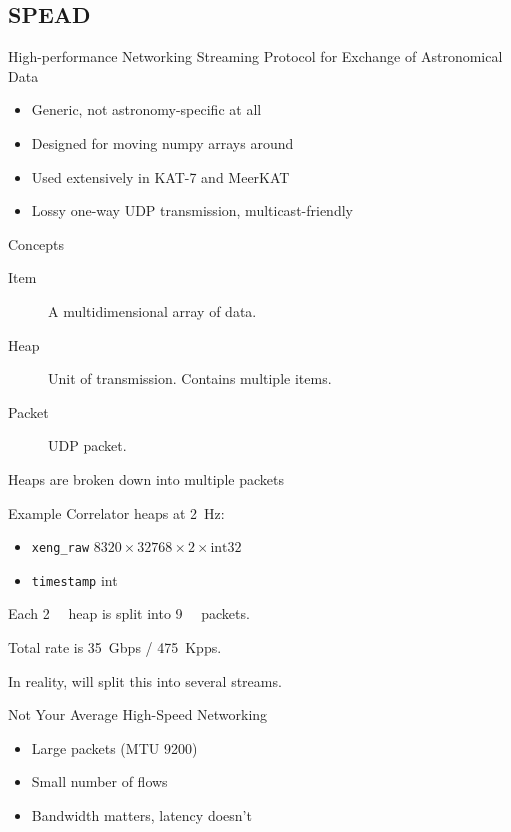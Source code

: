 \documentclass{beamer}
\begin{document}
\subsection{SPEAD}

\begin{frame}{High-performance Networking}
  \alert{S}treaming \alert{P}rotocol for \alert{E}xchange of
  \alert{A}stronomical \alert{D}ata
  \begin{itemize}
    \item Generic, not astronomy-specific at all
    \item Designed for moving numpy arrays around
    \item Used extensively in KAT-7 and MeerKAT
    \item Lossy one-way UDP transmission, multicast-friendly
  \end{itemize}
\end{frame}

\begin{frame}{Concepts}
  \begin{description}
    \item[Item] A multidimensional array of data.
    \item[Heap] Unit of transmission. Contains multiple items.
    \item[Packet] UDP packet.
  \end{description}
  Heaps are broken down into multiple packets
\end{frame}

\begin{frame}{Example}
  Correlator heaps at \SI{2}{\Hz}:
  \begin{itemize}
    \item \texttt{xeng_raw} $8320\times 32768\times 2\times \text{int32}$
    \item \texttt{timestamp} int
  \end{itemize}
  Each \SI{2}{\gibi\byte} heap is split into \SI{9}{\kilo\byte} packets.

  \pause
  Total rate is \SI{35}{Gbps} / \SI{475}{Kpps}.

  \pause
  In reality, will split this into several streams.
\end{frame}

\begin{frame}{Not Your Average High-Speed Networking}
  \begin{itemize}
    \item Large packets (MTU 9200)
    \item Small number of flows
    \item Bandwidth matters, latency doesn't
  \end{itemize}
\end{frame}
\end{document}

